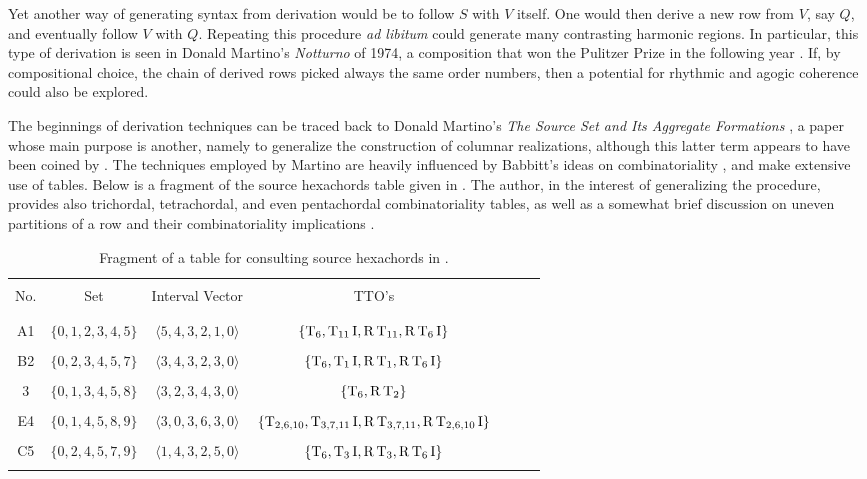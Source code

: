 Yet another way of generating syntax from derivation would be to follow $S$ with $V$ itself. One would then derive a new row from $V$, say $Q$, and eventually follow $V$ with $Q$. Repeating this procedure \emph{ad libitum} could generate many contrasting harmonic regions. In particular, this type of derivation is seen in Donald Martino's \emph{Notturno} of 1974, a composition that won the Pulitzer Prize in the following year \cite[181]{Starr1984}. If, by compositional choice, the chain of derived rows picked always the same order numbers, then a potential for rhythmic and agogic coherence could also be explored.

The beginnings of derivation techniques can be traced back to Donald Martino's \emph{The Source Set and Its Aggregate Formations} \cite{Martino1961}, a paper whose main purpose is another, namely to generalize the construction of columnar realizations, although this latter term appears to have been coined by \cite{Starr1984}. The techniques employed by Martino are heavily influenced by Babbitt's ideas on combinatoriality \cite[224]{Martino1961}, and make extensive use of tables. Below is a fragment of the source hexachords table given in \cite[229]{Martino1961}. The author, in the interest of generalizing the procedure, provides also trichordal, tetrachordal, and even pentachordal combinatoriality tables, as well as a somewhat brief discussion on uneven partitions of a row and their combinatoriality implications \cite[267]{Martino1961}.

\begin{table}[htbp]
    \caption[Martino's Source Hexachords]{Fragment of a table for consulting source hexachords in \cite[229]{Martino1961}.}
    \centering
    \vspace{12pt}
    \begin{tabular}{c|cccccc}
        \hline\\
        No. & Set & Interval Vector & TTO's \\\\
        \hline\\
        A1 & $\{0,1,2,3,4,5\}$ & $\langle 5,4,3,2,1,0 \rangle$ & $\{\operatorname{T}_6,\operatorname{T}_{11}\operatorname{I},\operatorname{R}\operatorname{T}_{11},\operatorname{R}\operatorname{T}_6\operatorname{I}\}$ \\\\
        B2 & $\{0,2,3,4,5,7\}$ & $\langle 3,4,3,2,3,0 \rangle$ & $\{\operatorname{T}_6,\operatorname{T}_{1}\operatorname{I},\operatorname{R}\operatorname{T}_{1},\operatorname{R}\operatorname{T}_6\operatorname{I}\}$ \\\\
        3 & $\{0,1,3,4,5,8\}$ & $\langle 3,2,3,4,3,0 \rangle$ & $\{\operatorname{T}_6,\operatorname{R}\operatorname{T}_2\}$ \\\\
        E4 & $\{0,1,4,5,8,9\}$ & $\langle 3,0,3,6,3,0 \rangle$ & $\{\operatorname{T}_{2,6,10},\operatorname{T}_{3,7,11}\operatorname{I},\operatorname{R}\operatorname{T}_{3,7,11},\operatorname{R}\operatorname{T}_{2,6,10}\operatorname{I}\}$ \\\\
        C5 & $\{0,2,4,5,7,9\}$ & $\langle 1,4,3,2,5,0 \rangle$ & $\{\operatorname{T}_6,\operatorname{T}_{3}\operatorname{I},\operatorname{R}\operatorname{T}_{3},\operatorname{R}\operatorname{T}_6\operatorname{I}\}$ \\\\
        \hline
    \end{tabular}
\end{table}


